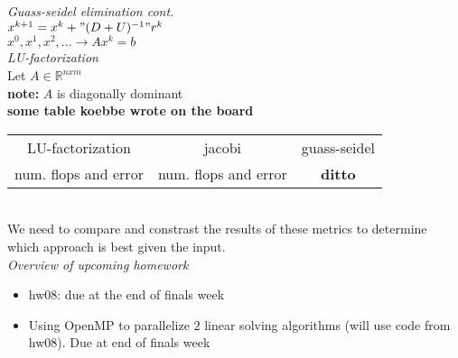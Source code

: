 \documentclass[10pt, AMS Euler]{article}
\newcommand{\R}{\mathbb{R}}
\begin{document}
\textit{Guass-seidel elimination cont.}\\

$x^{k+1} = x^k + "(D + U)^{-1}" r^k$\\
$x^0, x^1, x^2, ... \rightarrow Ax^k = b$\\

\textit{LU-factorization}\\
Let $A \in \R^{n x m}$\\
\textbf{note:} $A$ is diagonally dominant\\


\textbf{some table koebbe wrote on the board}\\
\begin{tabular}{c c c}
    LU-factorization & jacobi & guass-seidel\\
    num. flops and error & num. flops and error & \textbf{ditto}\\
    
\end{tabular}\\

We need to compare and constrast the results of these metrics to determine which approach is best given the input.\\

\textit{Overview of upcoming homework}\\
\begin{itemize}
    \item hw08: due at the end of finals week
    \item Using OpenMP to parallelize $2$ linear solving algorithms (will use code from hw08). Due at end of finals week
\end{itemize}
\noindent \underline{\hspace{3in}}\\
\end{document}
